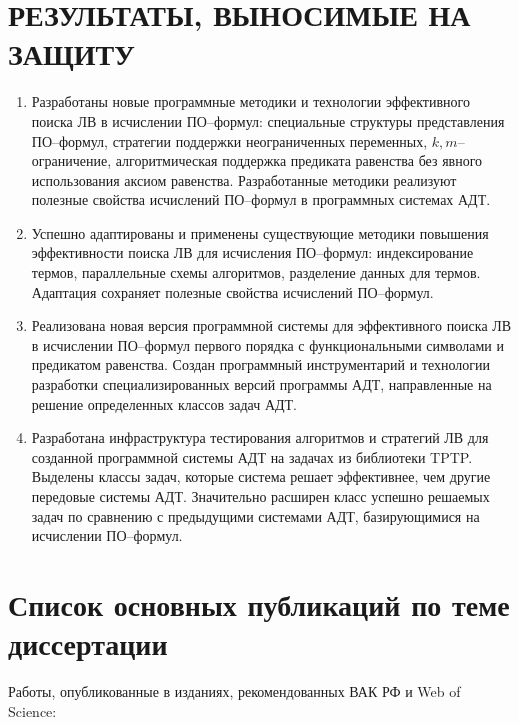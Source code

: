 \documentclass[a4paper]{report}
\begin{document}
\section*{РЕЗУЛЬТАТЫ, ВЫНОСИМЫЕ НА ЗАЩИТУ}
\begin{enumerate}
\item Разработаны новые программные методики и технологии эффективного поиска ЛВ в исчислении ПО--формул: специальные структуры представления ПО--формул, стратегии поддержки неограниченных переменных, $k,m$--огра\-ни\-че\-ние, алгоритмическая поддержка предиката равенства без явного использования аксиом равенства. Разработанные методики реализуют полезные свойства исчислений ПО--формул в программных системах АДТ.

\item Успешно адаптированы и применены существующие методики повышения эффективности поиска ЛВ для исчисления ПО--формул: индексирование термов, параллельные схемы алгоритмов, разделение данных для термов. Адаптация сохраняет полезные свойства исчислений ПО--формул.

\item Реализована новая версия программной системы для эффективного поиска ЛВ в исчислении ПО--формул первого порядка с функциональными символами и предикатом равенства. Создан программный инструментарий и технологии разработки специализированных версий программы АДТ, направленные на решение определенных классов задач АДТ. %

\item Разработана инфраструктура тестирования алгоритмов и стратегий ЛВ для созданной программной системы АДТ на задачах из библиотеки TPTP. Выделены классы задач, которые система решает эффективнее, чем другие передовые системы АДТ. Значительно расширен класс успешно решаемых задач по сравнению с предыдущими системами АДТ, базирующимися на исчислении ПО--формул.
\end{enumerate}



\section*{Список основных публикаций по теме диссертации}

Работы, опубликованные в изданиях, рекомендованных ВАК РФ и Web of Science:
\end{document}
